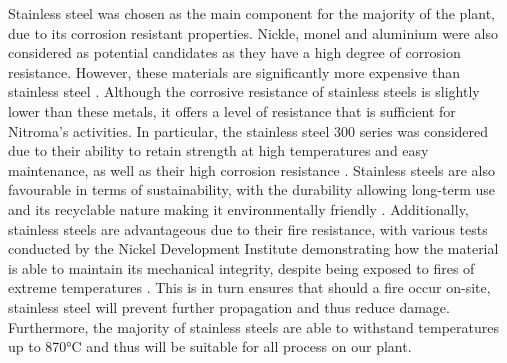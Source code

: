 Stainless steel was chosen as the main component for the majority of the plant, due to its corrosion resistant properties. Nickle, monel and aluminium were also considered as potential candidates as they have a high degree of corrosion resistance. However, these materials are significantly more expensive than stainless steel \cite{sinnott_coulson_2005}. Although the corrosive resistance of stainless steels is slightly lower than these metals, it offers a level of resistance that is sufficient for Nitroma's activities. In particular, the stainless steel 300 series was considered due to their ability to retain strength at high temperatures and easy maintenance, as well as their high corrosion resistance \cite{national_electronic_alloys_300_2021}. Stainless steels are also favourable in terms of sustainability, with the durability allowing long-term use and its recyclable nature making it environmentally friendly \cite{osterman_stainless_2013}. Additionally, stainless steels are advantageous due to their fire resistance, with various tests conducted by the Nickel Development Institute demonstrating how the material is able to maintain its mechanical integrity, despite being exposed to fires of extreme temperatures \cite{waller_stainless_1990}. This is in turn ensures that should a fire occur on-site, stainless steel will prevent further propagation and thus reduce damage.  Furthermore, the majority of stainless steels are able to withstand temperatures up to 870°C and thus will be suitable for all process on our plant. 




